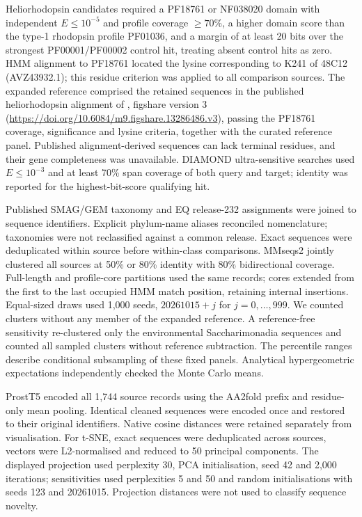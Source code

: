 \documentclass[11pt]{article}
\begin{document}
Heliorhodopsin candidates required a PF18761 or NF038020 domain with independent $E\leq10^{-5}$ and profile coverage $\geq70\%$, a higher domain score than the type-1 rhodopsin profile PF01036, and a margin of at least 20 bits over the strongest PF00001/PF00002 control hit, treating absent control hits as zero. HMM alignment to PF18761 located the lysine corresponding to K241 of 48C12 (AVZ43932.1); this residue criterion was applied to all comparison sources. The expanded reference comprised the retained sequences in the published heliorhodopsin alignment of \citet{bulzu2021heliorhodopsin}, figshare version 3 (\url{https://doi.org/10.6084/m9.figshare.13286486.v3}), passing the PF18761 coverage, significance and lysine criteria, together with the curated reference panel. Published alignment-derived sequences can lack terminal residues, and their gene completeness was unavailable. DIAMOND ultra-sensitive searches used $E\leq10^{-3}$ and at least 70\% span coverage of both query and target; identity was reported for the highest-bit-score qualifying hit.

Published SMAG/GEM taxonomy and EQ release-232 assignments were joined to sequence identifiers. Explicit phylum-name aliases reconciled nomenclature; taxonomies were not reclassified against a common release. Exact sequences were deduplicated within source before within-class comparisons. MMseqs2 jointly clustered all sources at 50\% or 80\% identity with 80\% bidirectional coverage. Full-length and profile-core partitions used the same records; cores extended from the first to the last occupied HMM match position, retaining internal insertions. Equal-sized draws used 1{,}000 seeds, $20261015+j$ for $j=0,\ldots,999$. We counted clusters without any member of the expanded reference. A reference-free sensitivity re-clustered only the environmental Saccharimonadia sequences and counted all sampled clusters without reference subtraction. The percentile ranges describe conditional subsampling of these fixed panels. Analytical hypergeometric expectations independently checked the Monte Carlo means.

ProstT5 \citep{heinzinger2024prostt5} encoded all 1{,}744 source records using the AA2fold prefix and residue-only mean pooling. Identical cleaned sequences were encoded once and restored to their original identifiers. Native cosine distances were retained separately from visualisation. For t-SNE, exact sequences were deduplicated across sources, vectors were L2-normalised and reduced to 50 principal components. The displayed projection used perplexity 30, PCA initialisation, seed 42 and 2{,}000 iterations; sensitivities used perplexities 5 and 50 and random initialisations with seeds 123 and 20261015. Projection distances were not used to classify sequence novelty.
\end{document}
